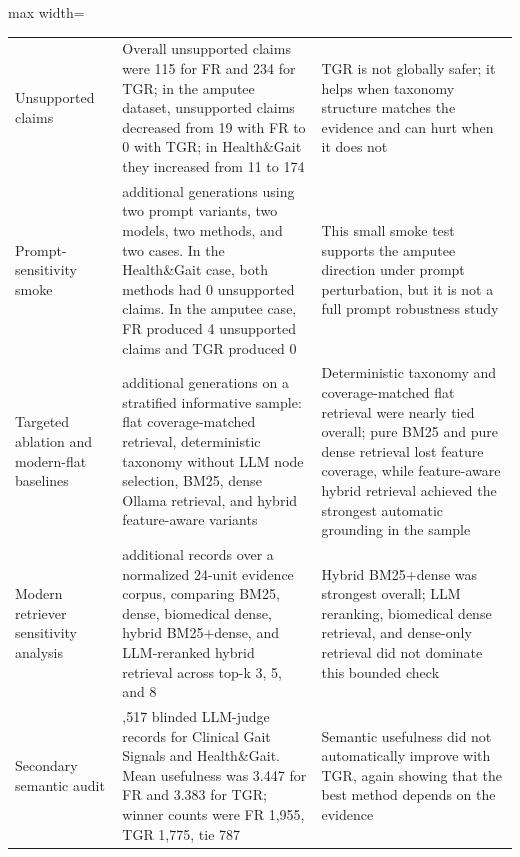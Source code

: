 \documentclass{article}
\begin{document}
\begin{table}[!ht]
\begin{adjustbox}{max width=\textwidth}
\begin{tabular}{@{}>{\raggedright\arraybackslash}p{}>{\raggedright\arraybackslash}p{}>{\raggedright\arraybackslash}p{}@{}}
Unsupported claims & Overall unsupported claims were 115 for FR and 234 for TGR; in the amputee dataset, unsupported claims decreased from 19 with FR to 0 with TGR; in Health\&Gait they increased from 11 to 174 & TGR is not globally safer; it helps when taxonomy structure matches the evidence and can hurt when it does not \\
Prompt-sensitivity smoke & 16 additional generations using two prompt variants, two models, two methods, and two cases. In the Health\&Gait case, both methods had 0 unsupported claims. In the amputee case, FR produced 4 unsupported claims and TGR produced 0 & This small smoke test supports the amputee direction under prompt perturbation, but it is not a full prompt robustness study \\
Targeted ablation and modern-flat baselines & 72 additional generations on a stratified informative sample: flat coverage-matched retrieval, deterministic taxonomy without LLM node selection, BM25, dense Ollama retrieval, and hybrid feature-aware variants & Deterministic taxonomy and coverage-matched flat retrieval were nearly tied overall; pure BM25 and pure dense retrieval lost feature coverage, while feature-aware hybrid retrieval achieved the strongest automatic grounding in the sample \\
Modern retriever sensitivity analysis & 216 additional records over a normalized 24-unit evidence corpus, comparing BM25, dense, biomedical dense, hybrid BM25+dense, and LLM-reranked hybrid retrieval across top-k 3, 5, and 8 & Hybrid BM25+dense was strongest overall; LLM reranking, biomedical dense retrieval, and dense-only retrieval did not dominate this bounded check \\
Secondary semantic audit & 4,517 blinded LLM-judge records for Clinical Gait Signals and Health\&Gait. Mean usefulness was 3.447 for FR and 3.383 for TGR; winner counts were FR 1,955, TGR 1,775, tie 787 & Semantic usefulness did not automatically improve with TGR, again showing that the best method depends on the evidence \\
\bottomrule
\end{tabular}
\end{adjustbox}
\end{table}
\end{document}
